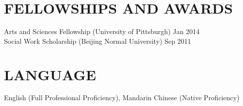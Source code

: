 \begin{resume}

%
%



\section{\textsc{FELLOWSHIPS AND AWARDS}}
Arts and Sciences Fellowship (University of Pittsburgh) \hfill Jan 2014\\
Social Work Scholarship (Beijing Normal University)  \hfill Sep 2011




\section{\textsc{LANGUAGE}}
English (Full Professional Proficiency), Mandarin Chinese (Native Proficiency)


\end{resume}

